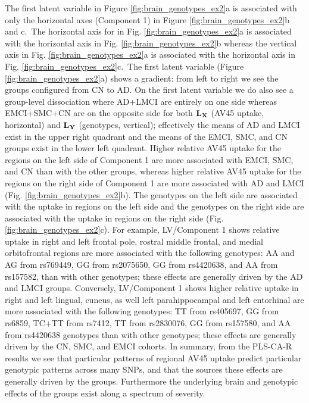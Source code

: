 \documentclass[12pt]{article}
\begin{document}
The first latent variable in Figure \ref{fig:brain_genotypes_ex2}a is
associated with only the horizontal axes (Component 1) in Figure
\ref{fig:brain_genotypes_ex2}b and c.~The horizontal axis for in Fig.
\ref{fig:brain_genotypes_ex2}a is associated with the horizontal axis in
Fig. \ref{fig:brain_genotypes_ex2}b whereas the vertical axis in Fig.
\ref{fig:brain_genotypes_ex2}a is associated with the horizontal axis in
Fig. \ref{fig:brain_genotypes_ex2}c.~The first latent variable (Figure
\ref{fig:brain_genotypes_ex2}a) shows a gradient: from left to right we
see the groups configured from CN to AD. On the first latent variable we
do also see a group-level dissociation where AD+LMCI are entirely on one
side whereas EMCI+SMC+CN are on the opposite side for both
\({\bf L}_{\bf X}\) (AV45 uptake, horizontal) and \({\bf L}_{\bf Y}\)
(genotypes, vertical); effectively the means of AD and LMCI exist in the
upper right quadrant and the means of the EMCI, SMC, and CN groups exist
in the lower left quadrant. Higher relative AV45 uptake for the regions
on the left side of Component 1 are more associated with EMCI, SMC, and
CN than with the other groups, whereas higher relative AV45 uptake for
the regions on the right side of Component 1 are more associated with AD
and LMCI (Fig. \ref{fig:brain_genotypes_ex2}b). The genotypes on the
left side are associated with the uptake in regions on the left side and
the genotypes on the right side are associated with the uptake in
regions on the right side (Fig. \ref{fig:brain_genotypes_ex2}c). For
example, LV/Component 1 shows relative uptake in right and left frontal
pole, rostral middle frontal, and medial orbitofrontal regions are more
associated with the following genotypes: AA and AG from rs769449, GG
from rs2075650, GG from rs4420638, and AA from rs157582, than with other
genotypes; these effects are generally driven by the AD and LMCI groups.
Conversely, LV/Component 1 shows higher relative uptake in right and
left lingual, cuneus, as well left parahippocampal and left entorhinal
are more associated with the following genotypes: TT from rs405697, GG
from rs6859, TC+TT from rs7412, TT from rs2830076, GG from rs157580, and
AA from rs4420638 genotypes than with other genotypes; these effects are
generally driven by the CN, SMC, and EMCI cohorts. In summary, from the
PLS-CA-R results we see that particular patterns of regional AV45 uptake
predict particular genotypic patterns across many SNPs, and that the
sources these effects are generally driven by the groups. Furthermore
the underlying brain and genotypic effects of the groups exist along a
spectrum of severity.
\end{document}
